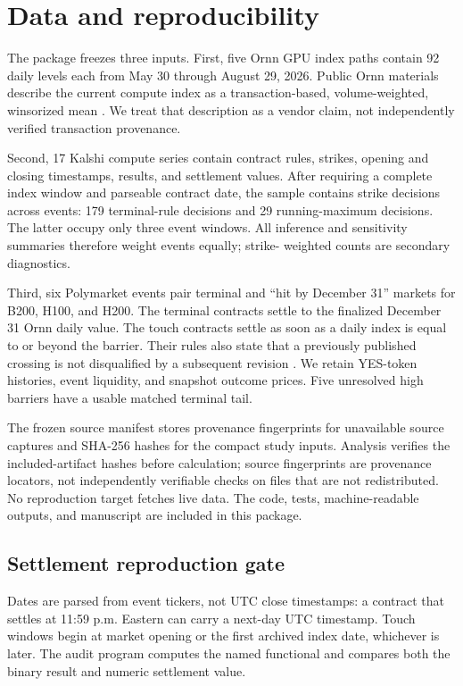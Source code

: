 \documentclass[10pt,twocolumn]{article}
\begin{document}
\section{Data and reproducibility}

The package freezes three inputs. First, five Ornn GPU index paths contain 92
daily levels each from May 30 through August 29, 2026. Public Ornn materials
describe the current compute index as a transaction-based, volume-weighted,
winsorized mean \citep{ornn2026}. We treat that description as a vendor claim,
not independently verified transaction provenance.

Second, 17 Kalshi compute series contain contract rules, strikes, opening and
closing timestamps, results, and settlement values. After requiring a complete
index window and parseable contract date, the sample contains \NContracts{}
strike decisions across \NEvents{} events: 179 terminal-rule decisions and 29
running-maximum decisions. The latter occupy only three event windows. All
inference and sensitivity summaries therefore weight events equally; strike-
weighted counts are secondary diagnostics.

Third, six Polymarket events pair terminal and ``hit by December 31'' markets
for B200, H100, and H200. The terminal contracts settle to the finalized December
31 Ornn daily value. The touch contracts settle as soon as a daily index is
equal to or beyond the barrier. Their rules also state that a previously
published crossing is not disqualified by a subsequent revision
\citep{polyterminal2026,polytouch2026}. We retain YES-token histories, event
liquidity, and snapshot outcome prices. Five unresolved high barriers have a
usable matched terminal tail.

The frozen source manifest stores provenance fingerprints for unavailable
source captures and SHA-256 hashes for the compact study inputs. Analysis
verifies the included-artifact hashes before calculation; source fingerprints
are provenance locators, not independently verifiable checks on files that are
not redistributed. No reproduction target fetches live data. The code, tests,
machine-readable outputs, and manuscript are included in this package.

\subsection{Settlement reproduction gate}

Dates are parsed from event tickers, not UTC close timestamps: a contract that
settles at 11:59 p.m. Eastern can carry a next-day UTC timestamp. Touch windows
begin at market opening or the first archived index date, whichever is later.
The audit program computes the named functional and compares both the binary result
and numeric settlement value.
\end{document}
